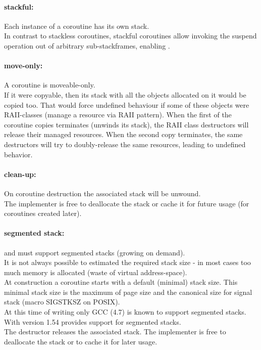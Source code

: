 \paragraph*{stackful:}
Each instance of a coroutine has its own stack.\\
\newline
In contrast to stackless coroutines, stackful coroutines allow invoking the
suspend operation out of arbitrary sub-stackframes, enabling \escreops.

\paragraph*{move-only:}
A coroutine is moveable-only.\\
\newline
If it were copyable, then its stack with all the objects allocated on it
would be copied too. That would force undefined behaviour if some of these objects
were RAII-classes (manage a resource via RAII pattern). When the first of the
coroutine copies terminates (unwinds its stack), the RAII class destructors will
release their managed resources. When the second copy terminates, the same
destructors will try to doubly-release the same resources, leading to undefined
behavior.

\paragraph*{clean-up:}
On coroutine destruction the associated stack will be unwound.\\
\newline
The implementer is free to deallocate the stack or cache it for future usage
(for coroutines created later).

\paragraph*{segmented stack:}
\acoro and \scoro must support segmented stacks (growing on demand).\\
\newline
It is not always possible to estimated the required stack size - in most cases
too much memory is allocated (waste of virtual address-space).\\
\newline
At construction a coroutine starts with a default (minimal) stack size. This
minimal stack size is the maximum of page size and the canonical size for signal
stack (macro SIGSTKSZ on POSIX).\\
\newline
At this time of writing only GCC (4.7)\cite{gccsplit} is known to support
segmented stacks. With version 1.54 \boostcoroutine provides support for
segmented stacks.\\
\newline
The destructor releases the associated stack. The implementer is free to
deallocate the stack or to cache it for later usage.

